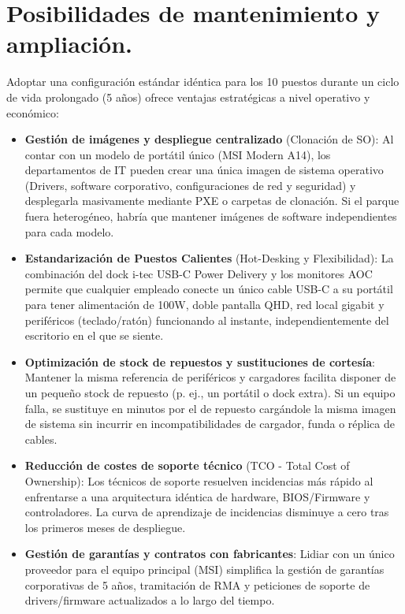 \documentclass[11.5pt]{article}
\begin{document}
	\section{Posibilidades de mantenimiento y ampliación.}
	
	Adoptar una configuración estándar idéntica para los 10 puestos durante un ciclo de vida prolongado (5 años) ofrece ventajas estratégicas a nivel operativo y económico:
	
	\begin{itemize}
		\item \textbf{Gestión de imágenes y despliegue centralizado} (Clonación de SO): Al contar con un modelo de portátil único (MSI Modern A14), los departamentos de IT pueden crear una única imagen de sistema operativo (Drivers, software corporativo, configuraciones de red y seguridad) y desplegarla masivamente mediante PXE o carpetas de clonación. Si el parque fuera heterogéneo, habría que mantener imágenes de software independientes para cada modelo.
		\item 	\textbf{Estandarización de Puestos Calientes} (Hot-Desking y Flexibilidad): La combinación del dock i-tec USB-C Power Delivery y los monitores AOC permite que cualquier empleado conecte un único cable USB-C a su portátil para tener alimentación de 100W, doble pantalla QHD, red local gigabit y periféricos (teclado/ratón) funcionando al instante, independientemente del escritorio en el que se siente.
		\item 	\textbf{Optimización de stock de repuestos y sustituciones de cortesía}: Mantener la misma referencia de periféricos y cargadores facilita disponer de un pequeño stock de repuesto (p. ej., un portátil o dock extra). Si un equipo falla, se sustituye en minutos por el de repuesto cargándole la misma imagen de sistema sin incurrir en incompatibilidades de cargador, funda o réplica de cables.
		\item 	\textbf{Reducción de costes de soporte técnico} (TCO - Total Cost of Ownership): Los técnicos de soporte resuelven incidencias más rápido al enfrentarse a una arquitectura idéntica de hardware, BIOS/Firmware y controladores. La curva de aprendizaje de incidencias disminuye a cero tras los primeros meses de despliegue.
		\item 	\textbf{Gestión de garantías y contratos con fabricantes}: Lidiar con un único proveedor para el equipo principal (MSI) simplifica la gestión de garantías corporativas de 5 años, tramitación de RMA y peticiones de soporte de drivers/firmware actualizados a lo largo del tiempo.
	\end{itemize}
	
\end{document}
